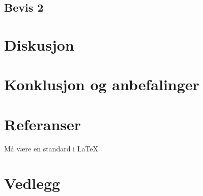 \documentclass{article}
\begin{document}
\subsection{Bevis 2} %
\label{sub:bevis_2}

\newpage





\section{Diskusjon} %
\label{sec:diskusjon}



\newpage


\section{Konklusjon og anbefalinger} %
\label{sec:konklusjon_og_anbefalinger}




\newpage


\section{Referanser} %
\label{sec:referanser}

Må være en standard i \LaTeX

\newpage


\section{Vedlegg} %
\label{sec:vedlegg}

\end{document}
